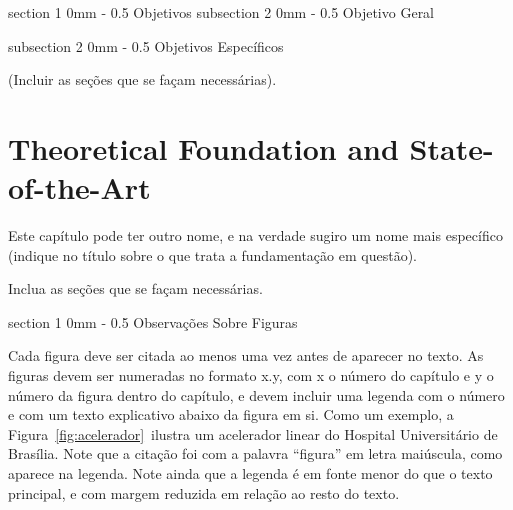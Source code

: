 \documentclass[a4paper, 12pt]{ppgeb}
\makeatletter
\renewcommand{\section}{\@startsection
{section}
{1}
{0mm}
{-\baselineskip}
{0.5\baselineskip}
{\large\bfseries\scshape}}
\renewcommand{\subsection}{\@startsection
{subsection}
{2}
{0mm}
{-\baselineskip}
{0.5\baselineskip}
{\bf\sffamily}}
\makeatother
\begin{document}
\section{Objetivos}
\subsection{Objetivo Geral}

\subsection{Objetivos Específicos}

(Incluir as seções que se façam necessárias).

\chapter{Theoretical Foundation and State-of-the-Art}\label{chap:FT}

Este capítulo pode ter outro nome, e na verdade sugiro um nome mais específico (indique no título sobre o que trata a fundamentação em questão).

Inclua as seções que se façam necessárias.

\section{Observações Sobre Figuras}

Cada figura deve ser citada ao menos uma vez antes de aparecer no texto. As figuras devem ser numeradas no formato x.y, com x o número do capítulo e y o número da figura dentro do capítulo, e devem incluir uma legenda com o número e com um texto explicativo abaixo da figura em si. Como um exemplo, a Figura~\ref{fig:acelerador} ilustra um acelerador linear do Hospital Universitário de Brasília. Note que a citação foi com a palavra ``figura'' em letra maiúscula, como aparece na legenda. Note ainda que a legenda é em fonte menor do que o texto principal, e com margem reduzida em relação ao resto do texto.
\end{document}
